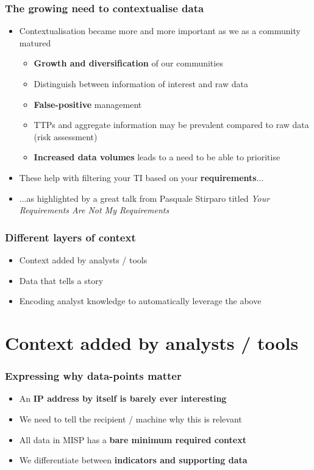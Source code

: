 \begin{frame}
\frametitle{The growing need to contextualise data}
\begin{itemize}
       \item Contextualisation became more and more important as we as a community matured
        \begin{itemize}
                \item {\bf Growth and diversification} of our communities
                \item Distinguish between information of interest and raw data
                \item {\bf False-positive} management
                \item TTPs and aggregate information may be prevalent compared to raw data (risk assessment)
                \item {\bf Increased data volumes} leads to a need to be able to prioritise
	\end{itemize}
	\item These help with filtering your TI based on your {\bf requirements}...
	\item ...as highlighted by a great talk from Pasquale Stirparo titled \textit{Your Requirements Are Not My Requirements}
\end{itemize}
\end{frame}

\begin{frame}
\frametitle{Different layers of context}
\begin{itemize}
       \item Context added by analysts / tools
       \item Data that tells a story
       \item Encoding analyst knowledge to automatically leverage the above
\end{itemize}
\end{frame}

\section{Context added by analysts / tools}

\begin{frame}
\frametitle{Expressing why data-points matter}
\begin{itemize}
       \item An {\bf IP address by itself is barely ever interesting}
       \item We need to tell the recipient / machine why this is relevant
       \item All data in MISP has a {\bf bare minimum required context}
       \item We differentiate between {\bf indicators and supporting data}
\end{itemize}
\end{frame}

